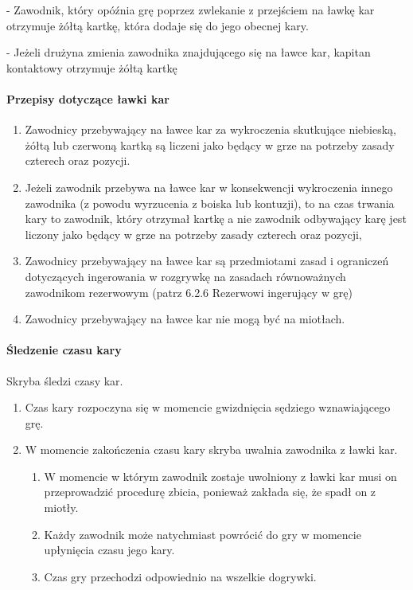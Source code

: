 \documentclass[12pt]{article}
\newcommand\yellowcard{\bgroup\color{yellow}\markoverwith{\textcolor{yellow}{\rule[-0.5ex]{2pt}{0.4pt}}}\ULon}
\begin{document}
\yellowcard{Żółta kartka} - Zawodnik, który opóźnia grę poprzez zwlekanie z
przejściem na ławkę kar otrzymuje żółtą kartkę, która dodaje się do jego
obecnej kary.

\yellowcard{Żółta kartka} - Jeżeli drużyna zmienia zawodnika znajdującego się
na ławce kar, kapitan kontaktowy otrzymuje żółtą kartkę

\paragraph{Przepisy dotyczące ławki kar}

\begin{enumerate}
	\item
	      Zawodnicy przebywający na ławce kar za wykroczenia skutkujące
	      niebieską, żółtą lub czerwoną kartką są liczeni jako będący w grze na
	      potrzeby zasady czterech oraz pozycji.
	\item
	      Jeżeli zawodnik przebywa na ławce kar w konsekwencji wykroczenia
	      innego zawodnika (z powodu wyrzucenia z boiska lub kontuzji), to na
	      czas trwania kary to zawodnik, który otrzymał kartkę a nie zawodnik
	      odbywający karę jest liczony jako będący w grze na potrzeby zasady
	      czterech oraz pozycji,
	\item
	      Zawodnicy przebywający na ławce kar są przedmiotami zasad i ograniczeń
	      dotyczących ingerowania w rozgrywkę na zasadach równoważnych
	      zawodnikom rezerwowym (patrz 6.2.6 Rezerwowi ingerujący w grę)
	\item
	      Zawodnicy przebywający na ławce kar nie mogą być na miotłach.
\end{enumerate}

\paragraph{Śledzenie czasu kary}
Skryba śledzi czasy kar.

\begin{enumerate}
	\item
	      Czas kary rozpoczyna się w momencie gwizdnięcia sędziego wznawiającego
	      grę.
	\item
	      W momencie zakończenia czasu kary skryba uwalnia zawodnika z ławki
	      kar.

	      \begin{enumerate}
		      \item
		            W momencie w którym zawodnik zostaje uwolniony z ławki kar musi on
		            przeprowadzić procedurę zbicia, ponieważ zakłada się, że spadł on z
		            miotły.
		      \item
		            Każdy zawodnik może natychmiast powrócić do gry w momencie
		            upłynięcia czasu jego kary.
		      \item
		            Czas gry przechodzi odpowiednio na wszelkie dogrywki.
	      \end{enumerate}
\end{enumerate}
\end{document}
